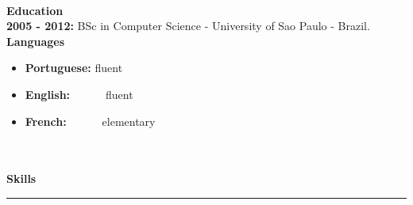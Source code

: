 \documentclass[a4paper, 10pt, onecolumn, oneside]{report}
\begin{document}
\\
{\large\textbf{Education}} \hspace{0.5em}\hrulefill
\\
	{\indent\textbf{2005 - 2012:} BSc in Computer Science - University of Sao Paulo - Brazil.}
\\
{\large\textbf{Languages}} \hspace{0.5em}\hrulefill
\begin{itemize}
	\item{\textbf{Portuguese:} fluent}
	\item{\textbf{English:\ \ \ \ \ } fluent}
	\item{\textbf{French:\ \ \ \ \ } elementary}
\end{itemize}
\\
\\
{\large\textbf{Skills}} \hfill \rule{5.7in}{0.5pt}\\
\end{document}
